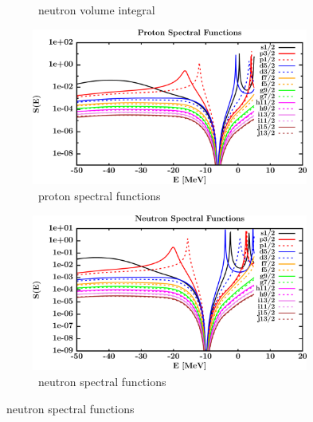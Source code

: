 \begin{figure}[hbtp]
\begin{subfigure}[b]{0.45\textwidth}
        \caption{\oSix\ neutron volume integral}
        \label{DOMFitData_o16_neutron_potentialIntegral}
    \end{subfigure}\vspace{0.3in}
    \begin{subfigure}[b]{0.45\textwidth}
        \centering
        \includegraphics[width=\linewidth]{figures/o16_protonSpectralFunctions.png}
        \caption{\oSix\ proton spectral functions}
        \label{DOMFitData_o16_proton_spectralFunctions}
    \end{subfigure}\hspace{6pt}
    \begin{subfigure}[b]{0.45\textwidth}
        \centering
        \includegraphics[width=\linewidth]{figures/o16_neutronSpectralFunctions.png}
        \caption{\oSix\ neutron spectral functions}
        \label{DOMFitData_o16_neutron_spectralFunctions}
    \end{subfigure}
\end{figure}
\afterpage{\clearpage}
